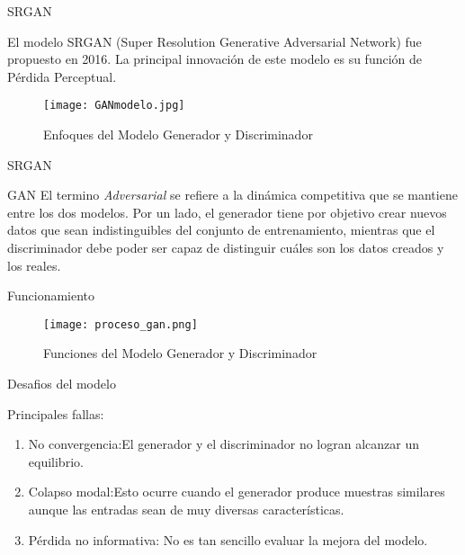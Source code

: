 \begin{frame}{SRGAN}
    

   El modelo SRGAN (Super Resolution Generative Adversarial Network) fue
   propuesto en 2016. La principal innovación de este modelo es su función de Pérdida Perceptual.

       
   \begin{figure}[H]
       \begin{center}
         \texttt{[image: GANmodelo.jpg]}
         \caption{Enfoques del Modelo Generador y Discriminador}
         \label{Alexis1}
       \end{center}
   \end{figure}
    

\end{frame}




\begin{frame}{SRGAN}

   \begin{block}{GAN}
      El termino \emph{Adversarial} se refiere a la dinámica 
      competitiva que se mantiene entre los dos modelos. Por un lado,
      el generador tiene por objetivo crear nuevos datos que sean indistinguibles del
      conjunto de entrenamiento, mientras que el discriminador debe poder ser capaz
      de distinguir cuáles son los datos creados y los reales.
   \end{block}
 
\end{frame}



\begin{frame}{Funcionamiento}
   \begin{figure}[H]
      \begin{center}
        \texttt{[image: proceso\_gan.png]}
        \caption{Funciones del Modelo Generador y Discriminador}
        \label{Alexis2}
      \end{center}
   \end{figure}
   
\end{frame}

\begin{frame}{Desafios del modelo}
    
   \begin{block}{Principales fallas:}
       \begin{enumerate}
           \item  No convergencia:El generador y el discriminador no logran alcanzar un equilibrio.
           \item  Colapso modal:Esto ocurre cuando el generador produce muestras similares aunque las entradas sean de muy diversas características.
           \item  Pérdida no informativa: No es tan sencillo evaluar la mejora del modelo.
       \end{enumerate}
   \end{block}

\end{frame}

